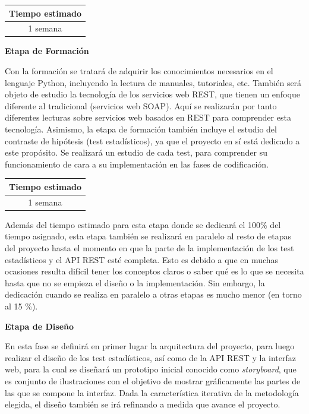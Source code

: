 \begin{table}[H]
	\centering
	\begin{tabular}{|c|}
		\hline
		\textbf{Tiempo estimado} \\ \hline
		1 semana \\ \hline
	\end{tabular}
\end{table}

\noindent
\textbf{Etapa de Formación}

Con la formación se tratará de adquirir los conocimientos necesarios en el lenguaje Python, incluyendo la lectura de manuales, tutoriales, etc. También será objeto de estudio la tecnología de los servicios web REST, que tienen un enfoque diferente al tradicional (servicios web SOAP). Aquí se realizarán por tanto diferentes lecturas sobre servicios web basados en REST para comprender esta tecnología. Asimismo, la etapa de formación también incluye el estudio del contraste de hipótesis (test estadísticos), ya que el proyecto en sí está dedicado a este propósito. Se realizará un estudio de cada test, para comprender su funcionamiento de cara a su implementación en las fases de codificación.

\begin{table}[H]
	\centering
	\begin{tabular}{|c|}
		\hline
		\textbf{Tiempo estimado} \\ \hline
		1 semana \\ \hline
	\end{tabular}
\end{table}

Además del tiempo estimado para esta etapa donde se dedicará el 100\% del tiempo asignado, esta etapa también se realizará en paralelo al resto de etapas del proyecto hasta el momento en que la parte de la implementación de los test estadísticos y el API REST esté completa. Esto es debido a que en muchas ocasiones resulta difícil tener los conceptos claros o saber qué es lo que se necesita hasta que no se empieza el diseño o la implementación. Sin embargo, la dedicación cuando se realiza en paralelo a otras etapas es mucho menor (en torno al 15 \%).

\noindent
\textbf{Etapa de Diseño}

En esta fase se definirá en primer lugar la arquitectura del proyecto, para luego realizar el diseño de los test estadísticos, así como de la API REST y la interfaz web, para la cual se diseñará un prototipo inicial conocido como \textit{storyboard}, que es conjunto de ilustraciones con el objetivo de mostrar gráficamente las partes de las que se compone la interfaz. Dada la característica iterativa de la metodología elegida, el diseño también se irá refinando a medida que avance el proyecto.

